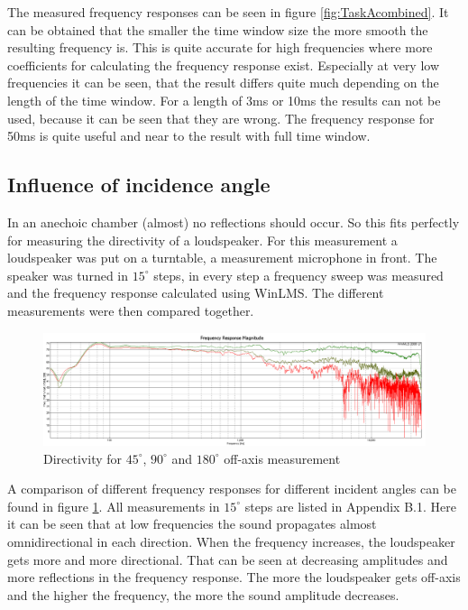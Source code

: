 \documentclass{article}
\begin{document}
The measured frequency responses can be seen in figure \ref{fig:TaskAcombined}.
It can be obtained that the smaller the time window size the more smooth the resulting frequency is. This is quite accurate for high frequencies where more coefficients for calculating the frequency response exist. Especially at very low frequencies it can be seen, that the result differs quite much depending on the length of the time window. For a length of 3ms or 10ms the results can not be used, because it can be seen that they are wrong. The frequency response for 50ms is quite useful and near to the result with full time window.
\subsection{Influence of incidence angle}
In an anechoic chamber (almost) no reflections should occur. So this fits perfectly for measuring the directivity of a loudspeaker. For this measurement a loudspeaker was put on a turntable, a measurement microphone in front. The speaker was turned in $15^\circ$ steps, in every step a frequency sweep was measured and the frequency response calculated using WinLMS. The different measurements were then compared together.\\
\begin{figure}[htbp]
\begin{center}
\includegraphics[width=15cm,keepaspectratio=true]{Figures/TaskBcomparison}
\caption{Directivity for $45^\circ$, $90^\circ$ and $180^\circ$ off-axis measurement}
\label{fig:TaskBcomparison}
\end{center}
\end{figure}
A comparison of different frequency responses for different incident angles can be found in figure \ref{fig:TaskBcomparison}. All measurements in $15^\circ$ steps are listed in Appendix B.1.
Here it can be seen that at low frequencies the sound propagates almost omnidirectional in each direction. When the frequency increases, the loudspeaker gets more and more directional. That can be seen at decreasing amplitudes and more reflections in the frequency response. The more the loudspeaker gets off-axis and the higher the frequency, the more the sound amplitude decreases.
\end{document}
